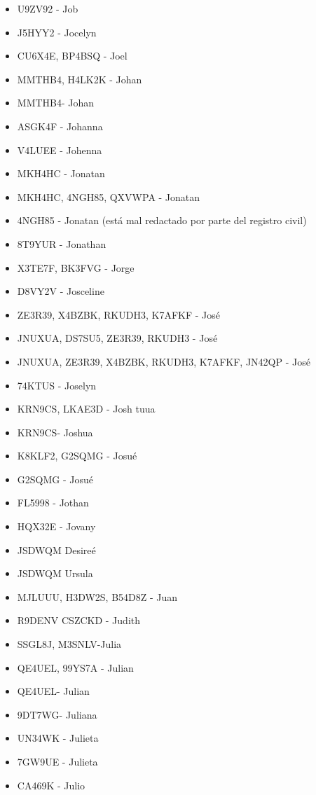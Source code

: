 \begin{itemize}[leftmargin=*,nosep]
\item U9ZV92 - Job
\item J5HYY2 - Jocelyn
\item CU6X4E, BP4BSQ - Joel
\item MMTHB4, H4LK2K - Johan
\item MMTHB4- Johan
\item ASGK4F - Johanna
\item V4LUEE - Johenna
\item MKH4HC - Jonatan
\item MKH4HC, 4NGH85, QXVWPA - Jonatan
\item 4NGH85 - Jonatan (está mal redactado por parte del registro civil)
\item 8T9YUR - Jonathan
\item X3TE7F, BK3FVG - Jorge
\item D8VY2V - Josceline
\item ZE3R39, X4BZBK, RKUDH3, K7AFKF - José
\item JNUXUA, DS7SU5, ZE3R39, RKUDH3 - José
\item JNUXUA, ZE3R39, X4BZBK, RKUDH3, K7AFKF, JN42QP - José
\item 74KTUS - Joselyn
\item KRN9CS, LKAE3D - Josh tuua
\item KRN9CS- Joshua
\item K8KLF2, G2SQMG - Josué
\item G2SQMG - Josué
\item FL5998 - Jothan
\item HQX32E - Jovany
\item JSDWQM Desireé
\item JSDWQM Ursula
\item MJLUUU, H3DW2S, B54D8Z - Juan
\item R9DENV CSZCKD - Judith
\item SSGL8J, M3SNLV-Julia
\item QE4UEL, 99YS7A - Julian
\item QE4UEL- Julian
\item 9DT7WG- Juliana
\item UN34WK - Julieta
\item 7GW9UE - Julieta
\item CA469K - Julio
\end{itemize}

